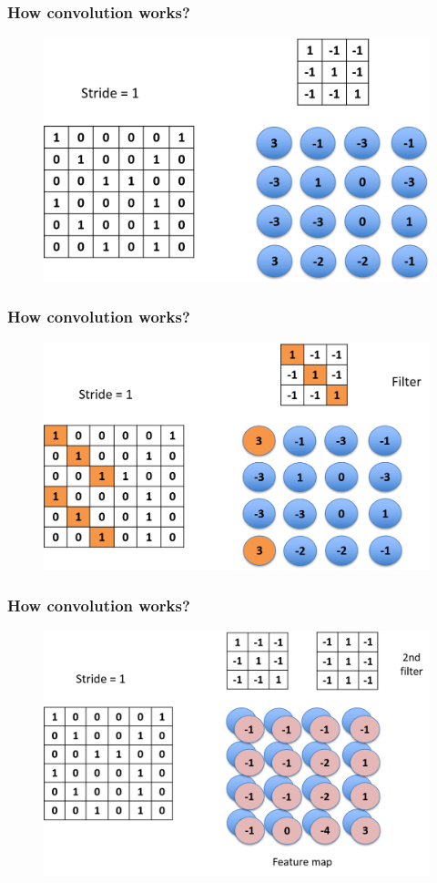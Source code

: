 \documentclass{beamer}
\begin{document}
\begin{frame}
	\frametitle{How convolution works?}
	\begin{figure}
	\includegraphics[width=0.8\linewidth]{Picture2}
	\end{figure}
\end{frame}

\begin{frame}
	\frametitle{How convolution works?}
	\begin{figure}
	\includegraphics[width=0.8\linewidth]{Picture3}
	\end{figure}
\end{frame}

\begin{frame}
	\frametitle{How convolution works?}
	\begin{figure}
	\includegraphics[width=0.8\linewidth]{Picture4}
	\end{figure}
\end{frame}
\end{document}
